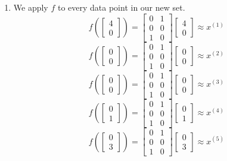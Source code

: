 \begin{enumerate}
    \item We apply $f$ to every data point in our new set.
$$f\left(\begin{bmatrix} 4\\ 0 \end{bmatrix}\right) = \begin{bmatrix} 0 & 1\\ 0 & 0\\ 1 & 0 \end{bmatrix} \begin{bmatrix} 4\\ 0 \end{bmatrix} \approx x^{(1)}$$
$$f\left(\begin{bmatrix} 0\\ 0 \end{bmatrix}\right) = \begin{bmatrix} 0 & 1\\ 0 & 0\\ 1 & 0 \end{bmatrix} \begin{bmatrix} 0\\ 0 \end{bmatrix} \approx x^{(2)}$$
$$f\left(\begin{bmatrix} 0\\ 0 \end{bmatrix}\right) = \begin{bmatrix} 0 & 1\\ 0 & 0\\ 1 & 0 \end{bmatrix} \begin{bmatrix} 0\\ 0 \end{bmatrix} \approx x^{(3)}$$
$$f\left(\begin{bmatrix} 0\\ 1 \end{bmatrix}\right) = \begin{bmatrix} 0 & 1\\ 0 & 0\\ 1 & 0 \end{bmatrix} \begin{bmatrix} 0\\ 1 \end{bmatrix} \approx x^{(4)}$$
$$f\left(\begin{bmatrix} 0\\ 3 \end{bmatrix}\right) = \begin{bmatrix} 0 & 1\\ 0 & 0\\ 1 & 0 \end{bmatrix} \begin{bmatrix} 0\\ 3 \end{bmatrix} \approx x^{(5)}$$

\end{enumerate}
